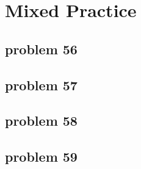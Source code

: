 \section{Mixed Practice}

\subsection{problem 56}


\subsection{problem 57}


\subsection{problem 58}


\subsection{problem 59}
